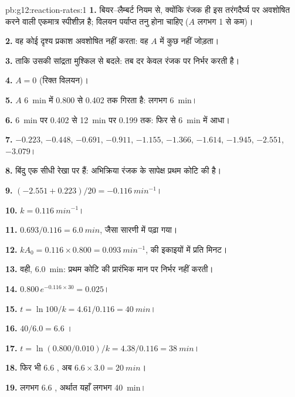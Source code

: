 \begin{solution}{pb:g12:reaction-rates:1}
\textbf{1.} बियर--लैम्बर्ट नियम से, क्योंकि रंजक ही इस तरंगदैर्घ्य पर अवशोषित करने वाली
एकमात्र स्पीशीज़ है; विलयन पर्याप्त तनु होना चाहिए
($A$ लगभग 1 से कम)।

\textbf{2.} वह कोई दृश्य प्रकाश अवशोषित नहीं करता: वह $A$ में कुछ नहीं जोड़ता।

\textbf{3.} ताकि उसकी सांद्रता मुश्किल से बदले: तब दर
केवल रंजक पर निर्भर करती है।

\textbf{4.} $A = 0$ (रिक्त विलयन)।

\textbf{5.} $A$ \qty{6}{min} में 0.800 से 0.402 तक गिरता है: लगभग
\qty{6}{min}।

\textbf{6.} \qty{6}{min} पर 0.402 से \qty{12}{min} पर 0.199 तक: फिर से
\qty{6}{min} में आधा।

\textbf{7.} $-0.223$, $-0.448$, $-0.691$, $-0.911$, $-1.155$, $-1.366$,
$-1.614$, $-1.945$, $-2.551$, $-3.079$।

\textbf{8.} बिंदु एक सीधी रेखा पर हैं: अभिक्रिया रंजक के सापेक्ष प्रथम
कोटि की है।

\textbf{9.} $(-2.551 + 0.223)/20 = \qty{-0.116}{min^{-1}}$।

\textbf{10.} $k = \qty{0.116}{min^{-1}}$।

\textbf{11.} $0.693 / 0.116 = \qty{6.0}{min}$, जैसा सारणी में पढ़ा गया।

\textbf{12.} $k A_0 = 0.116 \times 0.800 = \qty{0.093}{min^{-1}}$,
 की इकाइयों में प्रति मिनट।

\textbf{13.} वही, \qty{6.0}{min}: प्रथम कोटि की  प्रारंभिक मान
पर निर्भर नहीं करती।

\textbf{14.} $0.800\, e^{-0.116 \times 30} = 0.025$।

\textbf{15.} $t = \ln 100 / k = 4.61 / 0.116 = \qty{40}{min}$।

\textbf{16.} $40 / 6.0 = 6.6$ ।

\textbf{17.} $t = \ln(0.800/0.010)/k = 4.38 / 0.116 = \qty{38}{min}$।

\textbf{18.} फिर भी 6.6 , अब $6.6 \times 3.0 = \qty{20}{min}$।

\textbf{19.} लगभग 6.6 , अर्थात यहाँ लगभग \qty{40}{min}।
\end{solution}
